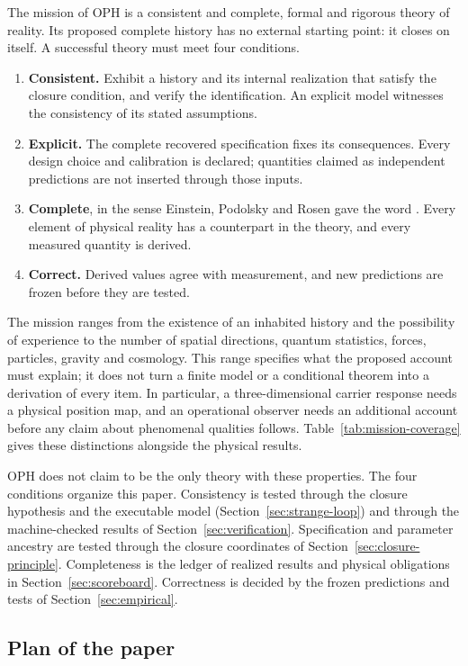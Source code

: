 \documentclass[11pt]{article}
\theoremstyle{definition}
\theoremstyle{remark}
\begin{document}
The mission of OPH is a consistent and complete, formal and rigorous
theory of reality. Its proposed complete history has no external starting
point: it closes on itself. A successful theory must meet four conditions.
\begin{enumerate}
\item \textbf{Consistent.} Exhibit a history and its internal realization
that satisfy the closure condition, and verify the identification. An
explicit model witnesses the consistency of its stated assumptions.
\item \textbf{Explicit.} The complete recovered specification fixes its
consequences. Every design choice and calibration is declared; quantities
claimed as independent predictions are not inserted through those inputs.
\item \textbf{Complete}, in the sense Einstein, Podolsky and Rosen gave the
word \cite{epr1935}. Every element of physical reality has a counterpart in
the theory, and every measured quantity is derived.
\item \textbf{Correct.} Derived values agree with measurement, and new
predictions are frozen before they are tested.
\end{enumerate}
The mission ranges from the existence of an inhabited history and the
possibility of experience to the number of spatial directions, quantum
statistics, forces, particles, gravity and cosmology. This range specifies
what the proposed account must explain; it does not turn a finite model or a
conditional theorem into a derivation of every item. In particular, a
three-dimensional carrier response needs a physical position map, and an
operational observer needs an additional account before any claim about
phenomenal qualities follows. Table~\ref{tab:mission-coverage} gives these
distinctions alongside the physical results.

OPH does not claim to be the only theory with these properties. The four
conditions organize this paper. Consistency is tested through the closure
hypothesis and the executable model (Section~\ref{sec:strange-loop}) and
through the machine-checked results of Section~\ref{sec:verification}.
Specification and parameter ancestry are tested through the closure
coordinates of Section~\ref{sec:closure-principle}. Completeness is the ledger of realized
results and physical obligations in Section~\ref{sec:scoreboard}.
Correctness is decided by the frozen predictions and tests of
Section~\ref{sec:empirical}.

\subsection{Plan of the paper}
\label{sec:place}
\end{document}
